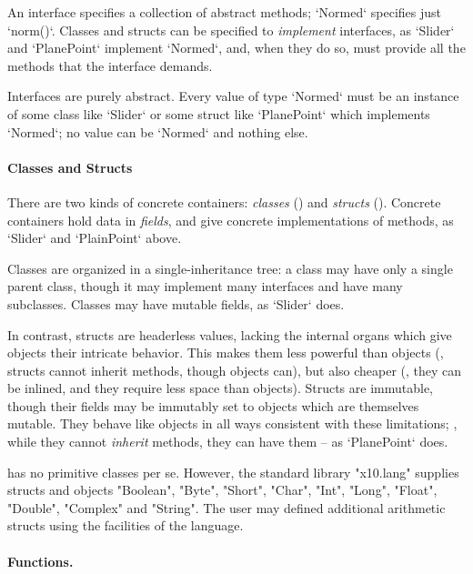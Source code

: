 An \Xten{} interface specifies a collection of abstract methods; \xcd`Normed`
specifies just \xcd`norm()`. Classes and
structs can be specified to {\em implement} interfaces, as \xcd`Slider` and
\xcd`PlanePoint` implement \xcd`Normed`, and, when they do so, must provide
all the methods that the interface demands.

Interfaces are
purely abstract. Every value of type \xcd`Normed` must be an instance of some
class like \xcd`Slider` or some struct like \xcd`PlanePoint` which implements
\xcd`Normed`; no value can be \xcd`Normed` and nothing else. 


\paragraph{Classes and Structs}

There are two kinds of concrete containers: \emph{classes}
() and \emph{structs} (). Concrete
containers hold data in {\em fields}, and give concrete implementations of
methods, as \xcd`Slider` and \xcd`PlainPoint` above.

Classes are organized in a single-inheritance tree: a class may have only a
single parent class, though it may implement many interfaces and have many
subclasses. Classes may have mutable fields, as \xcd`Slider` does.

In contrast, structs are headerless values, lacking the internal organs
which give objects their intricate behavior.  This makes them less powerful
than objects (\eg, structs cannot inherit methods, though objects can), but also
cheaper (\eg, they can be inlined, and they require less space than objects).  
Structs are immutable, though their fields may be immutably set to objects
which are themselves mutable.  They behave like objects in all ways consistent
with these limitations; \eg, while they cannot {\em inherit} methods, they can
have them -- as \xcd`PlanePoint` does.

\Xten{} has no primitive classes per se. However, the standard library
\xcd"x10.lang" supplies structs and objects \xcd"Boolean", \xcd"Byte",
\xcd"Short", \xcd"Char", \xcd"Int", \xcd"Long", \xcd"Float", \xcd"Double",
\xcd"Complex" and \xcd"String". The user may defined additional arithmetic
structs using the facilities of the language.



\paragraph{Functions.}

